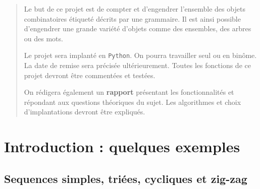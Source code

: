 \documentclass[11pt]{article}
\newcommand{\Python}{\texttt{Python}}
\begin{document}
\maketitle

\begin{abstract}
  Le but de ce projet est de compter et d'engendrer l'ensemble des objets
  combinatoires étiqueté décrits par une grammaire. Il est ainsi possible
  d'engendrer une grande variété d'objets comme des ensembles, des arbres ou
  des mots.  \smallskip

  Le projet sera implanté en \Python{}. On pourra travailler seul ou en
  binôme. La date de remise sera précisée ultérieurement. Toutes les fonctions
  de ce projet devront être commentées et testées.

  On rédigera également un \textbf{rapport} présentant les fonctionnalités et
  répondant aux questions théoriques du sujet. Les algorithmes et choix
  d'implantations devront être expliqués. 
\end{abstract}

\section{Introduction : quelques exemples}

\subsection{Sequences simples, triées, cycliques et zig-zag}
\end{document}
